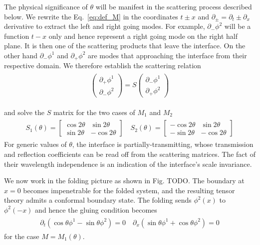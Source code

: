 The physical significance of $\theta$ will be manifest in the scattering process described below. We rewrite the Eq.~\eqref{eq:def_M} in the coordinates $t\pm x$ and $\partial_{\pm} = \partial_{t} \pm \partial_x $ derivative to extract the left and right going modes. For example, $\partial_{-} \phi^2$ will be a function $t - x$ only and hence represent a right going mode on the right half plane. It is then one of the scattering products that leave the interface. On the other hand $\partial_{-} \phi^1$ and $\partial_{+} \phi^2$ are modes that approaching the interface from their respective domain. We therefore establish the scattering relation 
\begin{eqnarray}\begin{aligned}
\label{eq:def_S}
\begin{pmatrix}
\partial_+\phi^1\\
\partial_-\phi^2
\end{pmatrix}
=S
\begin{pmatrix}
\partial_-\phi^1\\
\partial_+\phi^2
\end{pmatrix}
\end{aligned}\end{eqnarray}

and solve the $S$ matrix for the two cases of $M_1$ and $M_2$
\begin{eqnarray}\begin{aligned}
\label{eq:S1_S2}
S_1(\theta)=\begin{bmatrix}
\cos 2\theta & \sin 2\theta \\
\sin 2\theta & -\cos 2\theta
\end{bmatrix}\quad
S_2(\theta)=\begin{bmatrix}
-\cos 2\theta & \sin 2\theta \\
-\sin 2\theta & -\cos 2\theta
\end{bmatrix}
\end{aligned}\end{eqnarray}
For generic values of $\theta$, the interface is partially-transmitting, whose transmission and reflection coefficients can be read off from the scattering matrices. The fact of their wavelength independence is an indication of the interface's scale invariance. 

We now work in the folding picture as shown in Fig.{\color{red} TODO}. The boundary at $x=0$ becomes impenetrable for the folded system, and the resulting tensor theory admits a conformal boundary state. The folding sends $\phi^2(x)$ to $\phi^2(-x)$ and hence the gluing condition becomes
\begin{eqnarray}\begin{aligned}
\partial_t(\cos\theta\phi^1-\sin\theta\phi^2)=0 \quad
\partial_x(\sin\theta\phi^1+\cos\theta\phi^2)=0 
\end{aligned}\end{eqnarray}
for the case $M=M_1(\theta)$. 

